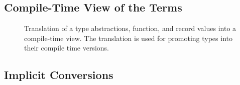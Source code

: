 \subsection{Compile-Time View of the Terms}
\label{sct:compile-views}
\begin{figure}
\begin{multicols}{2}[]

    {\Pi \ts {}}

    {\Pi \ts {}}

\end{multicols}
\vspace{4pt}

    {\Pi \ts {}}

    {\Pi \ts {}}

    {\Pi \ts {}}

    {\Pi \ts {}}

    {\Pi \ts {}}

    {\Pi \ts {}}

    {\Pi \ts {}}

\caption{Translation of a type abstractions, function, and record values into a compile-time view. The translation
 is used for promoting types into their compile time versions.}
\label{fig:ct-translation}
\end{figure}

\subsection{Implicit Conversions}
\label{sct:conversions}

